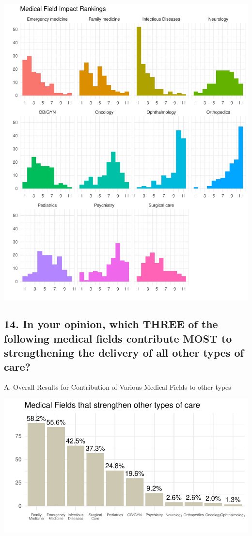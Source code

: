 \documentclass[
  letterpaper,
  DIV=11,
  numbers=noendperiod]{scrartcl}
\begin{document}
\includegraphics{GlobalHealthQuarto11-15_files/figure-pdf/unnamed-chunk-15-1.pdf}

\newpage

\hypertarget{in-your-opinion-which-three-of-the-following-medical-fields-contribute-most-to-strengthening-the-delivery-of-all-other-types-of-care}{%
\subsection{14. In your opinion, which THREE of the following medical
fields contribute MOST to strengthening the delivery of all other types
of
care?}\label{in-your-opinion-which-three-of-the-following-medical-fields-contribute-most-to-strengthening-the-delivery-of-all-other-types-of-care}}

A. Overall Results for Contribution of Various Medical Fields to other
types

\includegraphics{GlobalHealthQuarto11-15_files/figure-pdf/unnamed-chunk-16-1.pdf}
\end{document}

